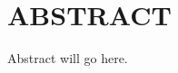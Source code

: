 \chapter*{ABSTRACT}

\pagestyle{plain} %
\setcounter{page}{2}

\indent Abstract will go here.

\pagebreak{}
